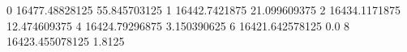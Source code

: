0 16477.48828125 55.845703125
1 16442.7421875 21.099609375
2 16434.1171875 12.474609375
4 16424.79296875 3.150390625
6 16421.642578125 0.0
8 16423.455078125 1.8125
